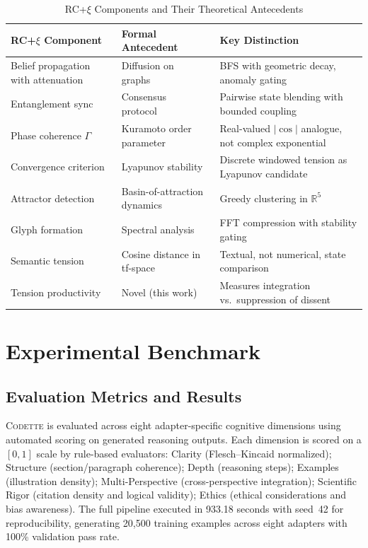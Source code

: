 \documentclass[11pt,a4paper]{article}
\newcommand{\codette}{\textsc{Codette}}
\begin{document}
\begin{table}[H]
\centering
\caption{RC+$\xi$ Components and Their Theoretical Antecedents}
\label{tab:formal_relationships}
\begin{tabular}{@{}p{3.5cm}p{4cm}p{5cm}@{}}
\toprule
\textbf{RC+$\xi$ Component} & \textbf{Formal Antecedent} & \textbf{Key Distinction} \\
\midrule
Belief propagation with attenuation & Diffusion on graphs~\citep{olfatisaber2007consensus} & BFS with geometric decay, anomaly gating \\
Entanglement sync & Consensus protocol~\citep{ren2005consensus} & Pairwise state blending with bounded coupling \\
Phase coherence $\Gamma$ & Kuramoto order parameter~\citep{kuramoto1984chemical,acebron2005kuramoto} & Real-valued $|\cos|$ analogue, not complex exponential \\
Convergence criterion & Lyapunov stability~\citep{khalil2002nonlinear} & Discrete windowed tension as Lyapunov candidate \\
Attractor detection & Basin-of-attraction dynamics~\citep{strogatz2015nonlinear} & Greedy clustering in $\mathbb{R}^5$ \\
Glyph formation & Spectral analysis~\citep{kelso1995dynamic} & FFT compression with stability gating \\
Semantic tension & Cosine distance in tf-space & Textual, not numerical, state comparison \\
Tension productivity & Novel (this work) & Measures integration vs.\ suppression of dissent \\
\bottomrule
\end{tabular}
\end{table}

\section{Experimental Benchmark}
\label{sec:experiments}

\subsection{Evaluation Metrics and Results}
\codette{} is evaluated across eight adapter-specific cognitive dimensions using automated scoring on generated reasoning outputs. Each dimension is scored on a $[0, 1]$ scale by rule-based evaluators: Clarity (Flesch--Kincaid normalized); Structure (section/paragraph coherence); Depth (reasoning steps); Examples (illustration density); Multi-Perspective (cross-perspective integration); Scientific Rigor (citation density and logical validity); Ethics (ethical considerations and bias awareness). The full pipeline executed in 933.18 seconds with seed~42 for reproducibility, generating 20,500 training examples across eight adapters with 100\% validation pass rate.
\end{document}
